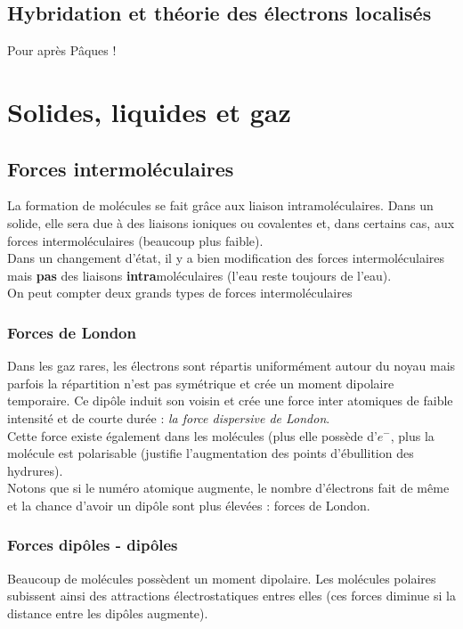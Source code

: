 \documentclass	[11pt, a4paper, openany]{book}
\begin{document}
	
	\section{Hybridation et théorie des électrons localisés}
	Pour après Pâques ! 
	
	\chapter{Solides, liquides et gaz}
	\section{Forces intermoléculaires}
	La formation de molécules se fait grâce aux liaison intramoléculaires. Dans un solide, elle sera due à des liaisons ioniques ou covalentes et, dans certains cas, aux forces intermoléculaires (beaucoup plus faible).\\
	
	Dans un changement d'état, il y a bien modification des forces intermoléculaires mais \textbf{pas} des liaisons \textbf{intra}moléculaires (l'eau reste toujours de l'eau).\\
	On peut compter deux grands types de forces intermoléculaires
	\subsection*{Forces de London}
	Dans les gaz rares, les électrons sont répartis uniformément autour du noyau mais parfois la répartition n'est pas symétrique et crée un moment dipolaire temporaire. Ce dipôle induit son voisin et crée une force inter atomiques de faible intensité et de courte durée : \textit{la force dispersive de London}.\\
	
	Cette force existe également dans les molécules (plus elle possède d'$e^-$, plus la molécule est polarisable (justifie l'augmentation des points d'ébullition des hydrures).\\
	Notons que si le numéro atomique augmente, le nombre d'électrons fait de même et la chance d'avoir un dipôle sont plus élevées : forces de London.
	
	\subsection*{Forces dipôles - dipôles}
	Beaucoup de molécules possèdent un moment dipolaire. Les molécules polaires subissent ainsi des attractions électrostatiques entres elles (ces forces diminue si la distance entre les dipôles augmente).\\
	
\end{document}
